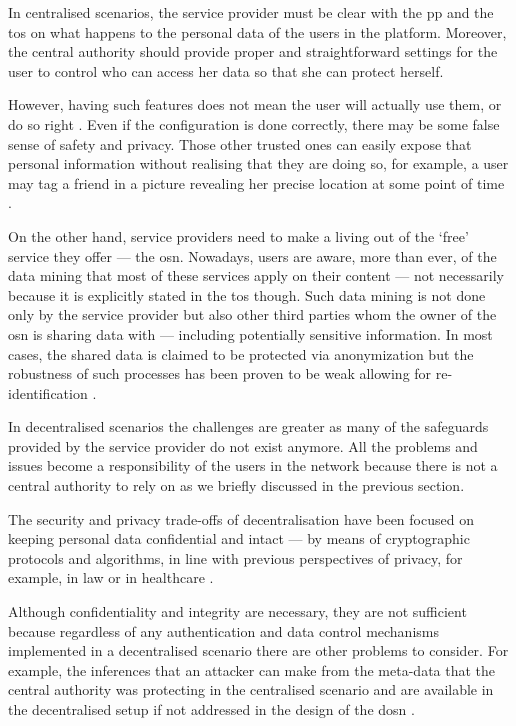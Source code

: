 In centralised scenarios, the service provider must be clear with the \ac{pp} and 
the \ac{tos} on what happens to the personal data of the users in the platform. 
Moreover, the central authority should provide proper and straightforward settings 
for the user to control who can access her data so that she can protect herself. 

However, having such features does not mean the user will actually use them, or   
do so right \cite{KrishnamurthyW08, BrandtzaegLS10}. Even if the configuration is 
done correctly, there may be some false sense of safety and privacy. Those other 
trusted ones can easily expose that personal information without realising that 
they are doing so, for example, a user may tag a friend in a picture revealing her 
precise location at some point of time \cite{ZhelevaG09, SmithSHV12}. 

On the other hand, service providers need to make a living out of the `free' service
they offer --- the \ac{osn}. Nowadays, users are aware, more than ever, of the data 
mining that most of these services apply on their content --- not necessarily because 
it is explicitly stated in the \ac{tos} though. Such data mining is not done only 
by the service provider but also other third parties whom the owner of the \ac{osn} 
is sharing data with --- including potentially sensitive information. In most cases, 
the shared data is claimed to be protected via anonymization but the robustness 
of such processes has been proven to be weak allowing for re-identification \cite{NarayananS09}.

In decentralised scenarios the challenges are greater as many of the safeguards 
provided by the service provider do not exist anymore. All the problems and issues 
become a responsibility of the users in the network because there is not a central 
authority to rely on as we briefly discussed in the previous section.

The security and privacy trade-offs of decentralisation have been focused on keeping 
personal data confidential and intact --- by means of cryptographic protocols and 
algorithms, in line with previous perspectives of privacy, for example, in law \cite{Harvey92} 
or in healthcare \cite{BarrowsC96}. 

Although confidentiality and integrity are necessary, they are not sufficient because 
regardless of any authentication and data control mechanisms implemented in a decentralised 
scenario there are other problems to consider. For example, the inferences that 
an attacker can make from the meta-data that the central authority was protecting 
in the centralised scenario and are available in the decentralised setup if not addressed 
in the design of the \ac{dosn} \cite{GreschbachKB12}.

